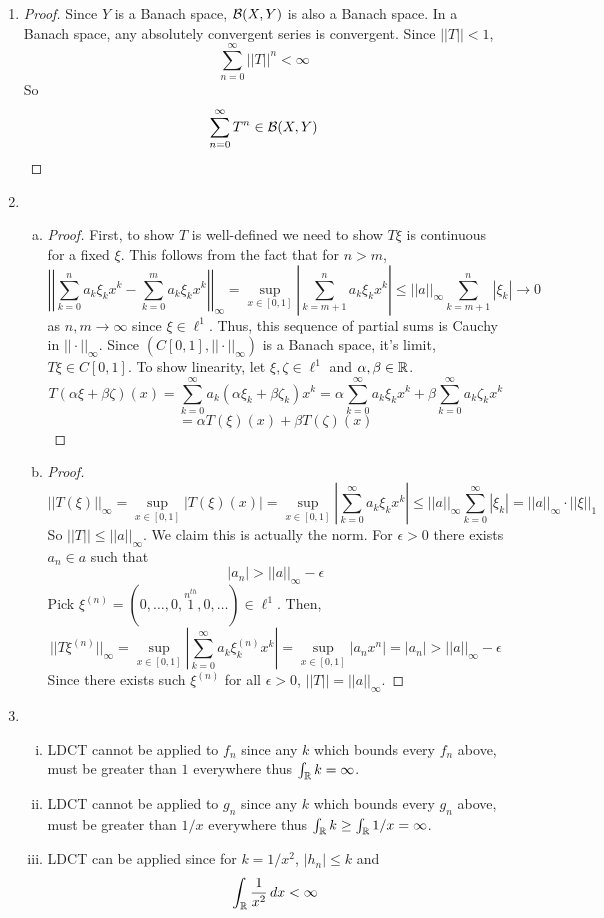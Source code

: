 \begin{enumerate}
\item \begin{proof}
	Since $Y$ is a Banach space, $\mathcal{B}(X,Y)$ is also a Banach space. In a Banach space, any absolutely convergent series is convergent. Since $||T|| < 1$,
		\[ \sum_{n=0}^\infty ||T||^n < \infty \]
	So 
		\[ \sum_{n=0}^\infty T^n \in \mathcal{B}(X,Y) \]
\end{proof}

\item 
	\begin{enumerate}[(a)]
	\item \begin{proof}
		First, to show $T$ is well-defined we need to show $T\xi$ is continuous for a fixed $\xi$. This follows from the fact that for $n>m$,
			\[ \left|\left| \sum_{k=0}^n a_k\xi_kx^k-\sum_{k=0}^m a_k\xi_kx^k \right|\right|_\infty = \sup_{x \in [0,1]} \left|\sum_{k=m+1}^n a_k\xi_kx^k \right| \le ||a||_\infty \sum_{k=m+1}^n |\xi_k| \to 0\]
		as $n,m \to \infty$ since $\xi \in \ell^1$. Thus, this sequence of partial sums is Cauchy in $||\cdot||_\infty$. Since $(C[0,1],||\cdot||_\infty)$ is a Banach space, it's limit, $T\xi \in C[0,1]$. To show linearity, let $\xi,\zeta \in \ell^1$ and $\alpha,\beta \in \mathbb{R}$.
		\[ T(\alpha\xi + \beta\zeta)(x) = \sum_{k=0}^\infty a_k(\alpha \xi_k + \beta\zeta_k)x^k = \alpha\sum_{k=0}^\infty a_k\xi_kx^k + \beta\sum_{k=0}^\infty a_k\zeta_kx^k \]
		\[= \alpha T(\xi)(x) + \beta T(\zeta)(x)\]
	\end{proof}
	\item \begin{proof}
		\[||T(\xi)||_\infty = \sup_{x\in[0,1]} |T(\xi)(x)| = \sup_{x\in[0,1]} \left|\sum_{k=0}^\infty a_k\xi_kx^k \right| \le ||a||_\infty \sum_{k=0}^\infty |\xi_k| = ||a||_\infty \cdot ||\xi||_1 \]
		So $||T|| \le ||a||_\infty$. We claim this is actually the norm. For $\epsilon>0$ there exists $a_n \in a$ such that
			\[ |a_n| > ||a||_\infty - \epsilon \]
		Pick $\xi^{(n)} = (0,\ldots,0,\overset{n^{th}}{1},0,\ldots) \in \ell^1$. Then,
			\[ ||T\xi^{(n)}||_\infty = \sup_{x\in[0,1]} \left|\sum_{k=0}^\infty a_k\xi^{(n)}_kx^k \right| = \sup_{x\in[0,1]}|a_nx^n| = |a_n| > ||a||_\infty -\epsilon \]
		Since there exists such $\xi^{(n)}$ for all $\epsilon>0$, $||T|| = ||a||_\infty$.
	\end{proof}
	\end{enumerate}

\item 
	\begin{enumerate}[(i)]
		\item LDCT cannot be applied to $f_n$ since any $k$ which bounds every $f_n$ above, must be greater than $1$ everywhere thus $\int_{\mathbb{R}} k = \infty$.
		\item LDCT cannot be applied to $g_n$ since any $k$ which bounds every $g_n$ above, must be greater than $1/x$ everywhere thus $\int_{\mathbb{R}} k \ge \int_{\mathbb{R}} 1/x= \infty$.
		\item LDCT can be applied since for $k=1/x^2$, $|h_n|\le k$ and
			\[ \int_{\mathbb{R}} \dfrac 1{x^2} \, dx < \infty \]
	\end{enumerate}


\end{enumerate}
